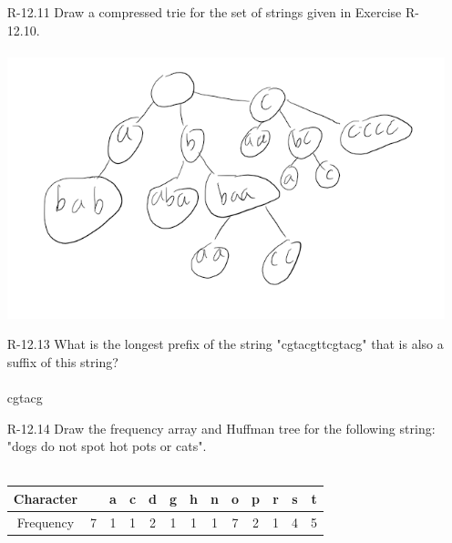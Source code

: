 \begin{itemize}
            \newpage
      \item[R-12.11]Draw a compressed trie for the set of strings given in Exercise R-12.10.\\
            \answer \\
            \includegraphics[scale=0.7]{img/R-12_11.png}
      \item [R-12.13] What is the longest prefix of the string "cgtacgttcgtacg" that is also a
            suffix of this string?\\
            \answer \\
            cgtacg
      \item[R-12.14] Draw the frequency array and Huffman tree for the following string:\\
            "dogs do not spot hot pots or cats".\\
            \answer \\
            \begin{tabular}{|*{13}{c|}}
                  \hline
                  Character &   & a & c & d & g & h & n & o & p & r & s & t \\
                  \hline
                  Frequency & 7 & 1 & 1 & 2 & 1 & 1 & 1 & 7 & 2 & 1 & 4 & 5 \\
                  \hline
            \end{tabular}
            \\

\end{itemize}
